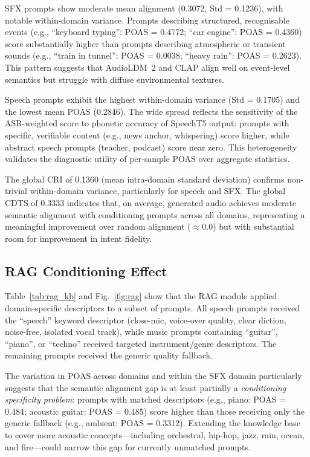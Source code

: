 \documentclass[journal]{IEEEtran}
\begin{document}
SFX prompts show moderate mean alignment (0.3072, Std = 0.1236),
with notable within-domain variance. Prompts describing structured,
recognisable events (e.g., ``keyboard typing'': POAS = 0.4772;
``car engine'': POAS = 0.4360) score substantially higher than prompts
describing atmospheric or transient sounds (e.g., ``train in tunnel'':
POAS = 0.0038; ``heavy rain'': POAS = 0.2623). This pattern suggests
that AudioLDM~2 and CLAP align well on event-level semantics but
struggle with diffuse environmental textures.

Speech prompts exhibit the highest within-domain variance
(Std = 0.1705) and the lowest mean POAS (0.2846). The wide spread
reflects the sensitivity of the ASR-weighted score to phonetic accuracy
of SpeechT5 output: prompts with specific, verifiable content (e.g.,
news anchor, whispering) score higher, while abstract speech prompts
(teacher, podcast) score near zero. This heterogeneity validates the
diagnostic utility of per-sample POAS over aggregate statistics.

The global CRI of 0.1360 (mean intra-domain standard deviation)
confirms non-trivial within-domain variance, particularly for speech
and SFX. The global CDTS of 0.3333 indicates that, on average,
generated audio achieves moderate semantic alignment with conditioning
prompts across all domains, representing a meaningful improvement over
random alignment ($\approx 0.0$) but with substantial room for
improvement in intent fidelity.

\subsection{RAG Conditioning Effect}

Table~\ref{tab:rag_kb} and Fig.~\ref{fig:rag} show that the RAG module
applied domain-specific descriptors to a subset of prompts. All speech
prompts received the ``speech'' keyword descriptor (close-mic,
voice-over quality, clear diction, noise-free, isolated vocal track),
while music prompts containing ``guitar'', ``piano'', or ``techno''
received targeted instrument/genre descriptors. The remaining prompts
received the generic quality fallback.

The variation in POAS across domains and within the SFX domain
particularly suggests that the semantic alignment gap is at least
partially a \textit{conditioning specificity problem}: prompts with
matched descriptors (e.g., piano: POAS = 0.484; acoustic guitar: POAS
= 0.485) score higher than those receiving only the generic fallback
(e.g., ambient: POAS = 0.3312). Extending the knowledge base to cover
more acoustic concepts---including orchestral, hip-hop, jazz, rain,
ocean, and fire---could narrow this gap for currently unmatched prompts.
\end{document}
